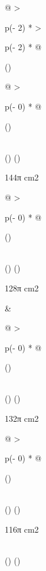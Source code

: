 \documentclass[
]{article}
\begin{document}
\begin{longtable}[]{@{}
  >{\raggedright\arraybackslash}p{(\columnwidth - 2\tabcolsep) * }
  >{\raggedright\arraybackslash}p{(\columnwidth - 2\tabcolsep) * }@{}}
\toprule()
\begin{minipage}[b]{\linewidth}\raggedright
\begin{longtable}[]{@{}
  >{\raggedright\arraybackslash}p{(\columnwidth - 0\tabcolsep) * }@{}}
\toprule()
\begin{minipage}[b]{\linewidth}\raggedright
\end{minipage} \\
\midrule()
\endhead
\bottomrule()
\end{longtable}

144π cm2

\begin{longtable}[]{@{}
  >{\raggedright\arraybackslash}p{(\columnwidth - 0\tabcolsep) * }@{}}
\toprule()
\begin{minipage}[b]{\linewidth}\raggedright
\end{minipage} \\
\midrule()
\endhead
\bottomrule()
\end{longtable}

128π cm2
\end{minipage} & \begin{minipage}[b]{\linewidth}\raggedright
\begin{longtable}[]{@{}
  >{\raggedright\arraybackslash}p{(\columnwidth - 0\tabcolsep) * }@{}}
\toprule()
\begin{minipage}[b]{\linewidth}\raggedright
\end{minipage} \\
\midrule()
\endhead
\bottomrule()
\end{longtable}

132π cm2

\begin{longtable}[]{@{}
  >{\raggedright\arraybackslash}p{(\columnwidth - 0\tabcolsep) * }@{}}
\toprule()
\begin{minipage}[b]{\linewidth}\raggedright
\end{minipage} \\
\midrule()
\endhead
\bottomrule()
\end{longtable}

116π cm2
\end{minipage} \\
\midrule()
\endhead
\bottomrule()
\end{longtable}
\end{document}
